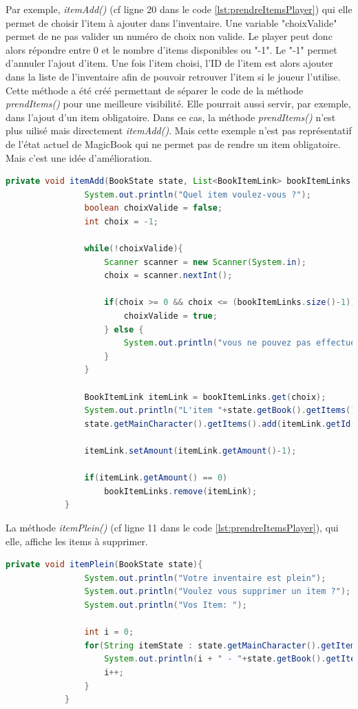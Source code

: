 		Par exemple, \textit{itemAdd()} (cf ligne 20 dans le code \ref{lst:prendreItemsPlayer}) qui elle permet de choisir l'item à ajouter dans l'inventaire. Une variable "choixValide" permet de ne pas valider un numéro de choix non valide. Le player peut donc alors répondre entre 0 et le nombre d'items disponibles ou "-1". Le "-1" permet d'annuler l'ajout d'item. Une fois l'item choisi, l'ID de l'item est alors ajouter dans la liste de l'inventaire afin de pouvoir retrouver l'item si le joueur l'utilise.\\
		Cette méthode a été créé permettant de séparer le code de la méthode \textit{prendItems()} pour une meilleure visibilité. Elle pourrait aussi servir, par exemple, dans l'ajout d'un item obligatoire. Dans ce cas, la méthode \textit{prendItems()} n'est plus uilisé mais directement \textit{itemAdd()}. Mais cette exemple n'est pas représentatif de l'état actuel de MagicBook qui ne permet pas de rendre un item obligatoire. Mais c'est une idée d'amélioration.\\

		\begin{lstlisting}[gobble=12, language=java, caption=itemAdd()]
			private void itemAdd(BookState state, List<BookItemLink> bookItemLinks){
				System.out.println("Quel item voulez-vous ?");
				boolean choixValide = false;
				int choix = -1;

				while(!choixValide){
					Scanner scanner = new Scanner(System.in);
					choix = scanner.nextInt();

					if(choix >= 0 && choix <= (bookItemLinks.size()-1)){
						choixValide = true;
					} else {
						System.out.println("vous ne pouvez pas effectuer ce choix");
					}
				}

				BookItemLink itemLink = bookItemLinks.get(choix);
				System.out.println("L'item "+state.getBook().getItems().get(itemLink.getId()).getName()+" a été rajouté");
				state.getMainCharacter().getItems().add(itemLink.getId());

				itemLink.setAmount(itemLink.getAmount()-1);

				if(itemLink.getAmount() == 0)
					bookItemLinks.remove(itemLink);
			}

		\end{lstlisting}

		La méthode \textit{itemPlein()} (cf ligne 11 dans le code \ref{lst:prendreItemsPlayer}), qui elle, affiche les items à supprimer.

		\begin{lstlisting}[gobble=12, language=java, caption=itemPlein()]
			private void itemPlein(BookState state){
				System.out.println("Votre inventaire est plein");
				System.out.println("Voulez vous supprimer un item ?");
				System.out.println("Vos Item: ");

				int i = 0;
				for(String itemState : state.getMainCharacter().getItems()){
					System.out.println(i + " - "+state.getBook().getItems().get(itemState));
					i++;
				}
			}
		\end{lstlisting}

